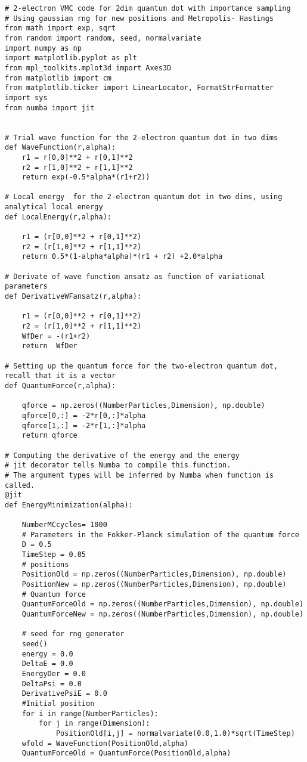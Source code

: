 \begin{verbatim}
# 2-electron VMC code for 2dim quantum dot with importance sampling
# Using gaussian rng for new positions and Metropolis- Hastings 
from math import exp, sqrt
from random import random, seed, normalvariate
import numpy as np
import matplotlib.pyplot as plt
from mpl_toolkits.mplot3d import Axes3D
from matplotlib import cm
from matplotlib.ticker import LinearLocator, FormatStrFormatter
import sys
from numba import jit


# Trial wave function for the 2-electron quantum dot in two dims
def WaveFunction(r,alpha):
    r1 = r[0,0]**2 + r[0,1]**2
    r2 = r[1,0]**2 + r[1,1]**2
    return exp(-0.5*alpha*(r1+r2))

# Local energy  for the 2-electron quantum dot in two dims, using analytical local energy
def LocalEnergy(r,alpha):
    
    r1 = (r[0,0]**2 + r[0,1]**2)
    r2 = (r[1,0]**2 + r[1,1]**2)
    return 0.5*(1-alpha*alpha)*(r1 + r2) +2.0*alpha

# Derivate of wave function ansatz as function of variational parameters
def DerivativeWFansatz(r,alpha):
    
    r1 = (r[0,0]**2 + r[0,1]**2)
    r2 = (r[1,0]**2 + r[1,1]**2)
    WfDer = -(r1+r2)
    return  WfDer

# Setting up the quantum force for the two-electron quantum dot, recall that it is a vector
def QuantumForce(r,alpha):

    qforce = np.zeros((NumberParticles,Dimension), np.double)
    qforce[0,:] = -2*r[0,:]*alpha
    qforce[1,:] = -2*r[1,:]*alpha
    return qforce
    
# Computing the derivative of the energy and the energy 
# jit decorator tells Numba to compile this function.
# The argument types will be inferred by Numba when function is called.
@jit
def EnergyMinimization(alpha):

    NumberMCcycles= 1000
    # Parameters in the Fokker-Planck simulation of the quantum force
    D = 0.5
    TimeStep = 0.05
    # positions
    PositionOld = np.zeros((NumberParticles,Dimension), np.double)
    PositionNew = np.zeros((NumberParticles,Dimension), np.double)
    # Quantum force
    QuantumForceOld = np.zeros((NumberParticles,Dimension), np.double)
    QuantumForceNew = np.zeros((NumberParticles,Dimension), np.double)

    # seed for rng generator 
    seed()
    energy = 0.0
    DeltaE = 0.0
    EnergyDer = 0.0
    DeltaPsi = 0.0
    DerivativePsiE = 0.0
    #Initial position
    for i in range(NumberParticles):
        for j in range(Dimension):
            PositionOld[i,j] = normalvariate(0.0,1.0)*sqrt(TimeStep)
    wfold = WaveFunction(PositionOld,alpha)
    QuantumForceOld = QuantumForce(PositionOld,alpha)


\end{verbatim}
